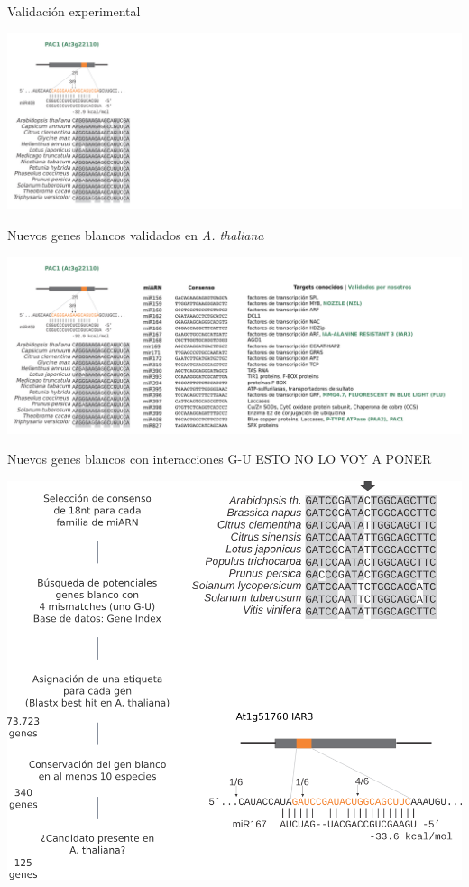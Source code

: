 \documentclass{beamer}
\begin{document}
\begin{frame}{Validación experimental}
	\begin{center}
		\includegraphics[width=1\textwidth]{img/Figure4_retocada_nueva01.png}
	\end{center}
\end{frame}


\begin{frame}{Nuevos genes blancos validados en \textit{A. thaliana}}
	\begin{center}
		\includegraphics[width=1\textwidth]{img/Figure4_retocada_nueva02.png}
	\end{center}
\end{frame}


\begin{frame}{Nuevos genes blancos con interacciones G-U}
ESTO NO LO VOY A PONER
	\begin{center}
		\includegraphics[width=.6\textwidth]{img/Figure5_retocada.png}
	\end{center}
\end{frame}
\end{document}
